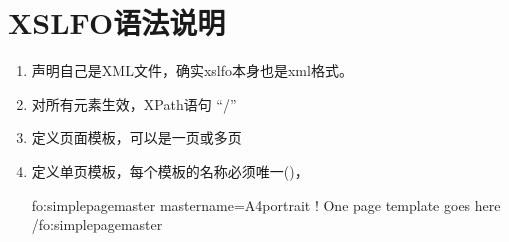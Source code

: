 \documentclass[letterpaper,10pt,english]{sphinxmanual}
\begin{document}
\section{XSL\sphinxhyphen{}FO语法说明}
\label{\detokenize{formatting/XSL-FO:id3}}\begin{enumerate}
%
\item {} 
\sphinxAtStartPar
声明自己是XML文件，确实xsl\sphinxhyphen{}fo本身也是xml格式。

\begin{sphinxVerbatim}[commandchars=\\\{\}]
\end{sphinxVerbatim}

\item {} 
\sphinxAtStartPar
对所有元素生效，XPath语句 “/”

\begin{sphinxVerbatim}[commandchars=\\\{\}]
\end{sphinxVerbatim}

\item {} 
\sphinxAtStartPar
定义页面模板，可以是一页或多页

\begin{sphinxVerbatim}[commandchars=\\\{\}]
\end{sphinxVerbatim}

\item {} 
\sphinxAtStartPar
定义单页模板，每个模板的名称必须唯一()，

\begin{sphinxVerbatim}[commandchars=\\\{\}]

\PYGZlt{}fo:simple\PYGZhy{}page\PYGZhy{}master master\PYGZhy{}name=\PYGZdq{}A4\PYGZhy{}portrait\PYGZdq{}\PYGZgt{}
  \PYGZlt{}!\PYGZhy{}\PYGZhy{} One page template goes here \PYGZhy{}\PYGZhy{}\PYGZgt{}
\PYGZlt{}/fo:simple\PYGZhy{}page\PYGZhy{}master\PYGZgt{}
\end{sphinxVerbatim}


\end{enumerate}
\end{document}
